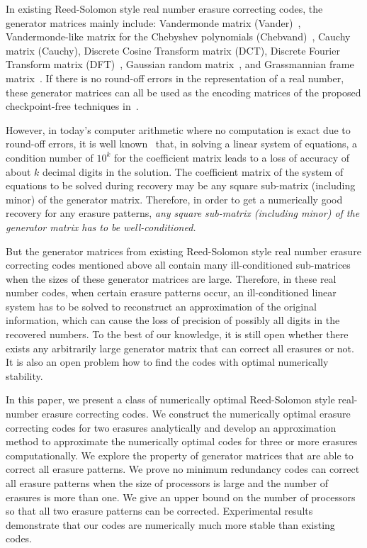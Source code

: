 \documentclass{sig-alternate}
\begin{document}
In existing Reed-Solomon style real number erasure correcting codes, 
the generator matrices mainly include: Vandermonde 
matrix (Vander)~\cite{hadjicostis:coding}, 
Vandermonde-like matrix for the Chebyshev polynomials 
(Chebvand)~\cite{boley92:abft}, Cauchy matrix (Cauchy), 
Discrete Cosine Transform matrix (DCT), Discrete Fourier 
Transform matrix (DFT)~\cite{Ferreira00, Ferreira03}, Gaussian 
random matrix~\cite{zchen:random_codes, zchen:random_condition},
and Grassmannian frame matrix~\cite{strohmer03:grassmannian}. 
If there is no round-off errors in the representation of a real number, 
these generator matrices can all be used 
as the encoding matrices of the proposed checkpoint-free 
techniques in~\cite{chen:abft}.

However, in today's computer arithmetic where no computation
is exact due to round-off errors, it is well 
known~\cite{golub89:matrix} that, in solving a 
linear system of equations, a condition number of $10^k$ for the coefficient matrix
leads to a loss of accuracy of about $k$ decimal digits in the solution.
The coefficient matrix of the system of equations to be solved during recovery
may be any square sub-matrix (including minor) of the generator matrix.
Therefore, in order to get a numerically good recovery for any erasure patterns, 
{\it any square sub-matrix (including minor) of the generator matrix
has to be well-conditioned.}

But the generator matrices from existing Reed-Solomon style 
real number erasure correcting codes 
mentioned above all contain many ill-conditioned sub-matrices when the sizes
of these generator matrices are large.
Therefore, in these real number codes, when certain erasure patterns occur, 
an ill-conditioned linear system has to be solved to reconstruct
an approximation of the original information, which can cause the 
loss of precision of possibly all digits in the recovered numbers.
To the best of our knowledge, it is still open whether there 
exists any arbitrarily large generator matrix 
that can correct all erasures or not. It is also an open problem how to
find the codes with optimal numerically stability. 

In this paper, we present a class of numerically optimal Reed-Solomon 
style real-number erasure correcting codes.  
We construct the numerically optimal erasure correcting codes for 
two erasures analytically and develop an approximation method to 
approximate the numerically optimal codes for three or more erasures computationally.
We explore the property of generator matrices that are able to correct all erasure patterns.
We prove no minimum redundancy codes can correct all erasure patterns 
when the size of processors is large and the number 
of erasures is more than one. We give an upper bound on 
the number of processors so that all two erasure patterns can be corrected. 
Experimental results demonstrate that our codes are numerically 
much more stable than existing codes. 
\end{document}
